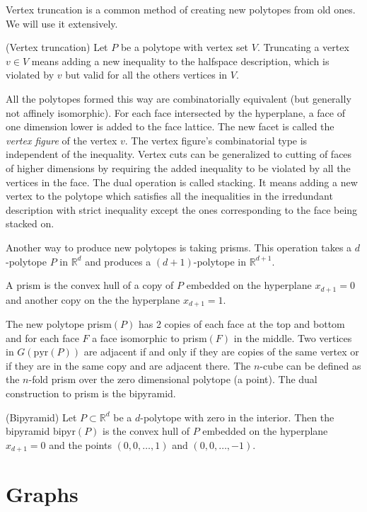 Vertex truncation is a common method of creating new polytopes from old ones.
We will use it extensively.
\begin{definition}
(Vertex truncation) Let $P$ be a polytope with vertex set $V$. Truncating a vertex $v \in V$ means adding
a new inequality to the halfspace description, which is violated by $v$ but valid for all the others vertices in $V$.
\end{definition}
All the polytopes formed this way are combinatorially equivalent (but generally not affinely isomorphic). 
For each face intersected by the hyperplane, 
a face of one dimension lower is added to the face lattice. The new facet is 
called the \textit{vertex figure} of the vertex $v$. The vertex figure's combinatorial type 
is independent of the inequality. Vertex cuts can be generalized to cutting of 
faces of higher dimensions by requiring the added inequality to be violated by 
all the vertices in the face. The dual operation is called stacking. 
It means adding a new vertex to the polytope which satisfies all the 
inequalities in the irredundant description with strict inequality except the 
ones corresponding to the face being stacked on.

Another way to produce new polytopes is taking prisms. This operation takes a 
$d$-polytope $P$ in $\mathbb{R}^d$ and produces a $(d+1)$-polytope in 
$\mathbb{R}^{d+1}$. 
\begin{definition}
 A prism is the convex hull of a copy of $P$ embedded on the hyperplane 
$x_{d+1} = 0$ and another copy on the the hyperplane $x_{d+1} = 1$.
\end{definition}

 The new polytope prism$(P)$ has 2 copies of 
each face at the top and bottom and for each face $F$ a face isomorphic to 
prism$(F)$ in the middle. Two vertices in $G(\text{pyr}(P))$ are adjacent if and only if
they are copies of the same vertex or if they are in the same copy and are 
adjacent there. 
The $n$-cube can be defined as the $n$-fold 
prism over the zero dimensional polytope (a point). The dual construction to prism 
is the bipyramid. 
\begin{definition}
 (Bipyramid) Let $P\subset \mathbb{R}^d$ be a $d$-polytope with zero in the 
interior. Then the bipyramid bipyr$(P)$ is the convex hull of $P$ embedded on 
the hyperplane $x_{d+1} = 0$ and the points $(0,0,\dots, 1)$ and $(0,0,\dots, 
-1)$.
\end{definition}

\section{Graphs}

